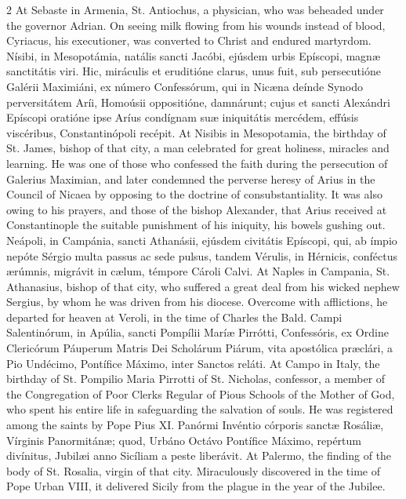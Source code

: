 \begin{paracol}{2}
At Sebaste in Armenia, St. 
 Antiochus, a physician, who was beheaded under the governor Adrian. On 
 seeing milk flowing from his wounds instead of blood, Cyriacus, his 
 executioner, was converted to Christ and endured martyrdom.
\switchcolumn*
{}
Nísibi, in Mesopotámia, natális sancti Jacóbi, ejúsdem urbis Epíscopi, magnæ sanctitátis viri. 
 Hic, miráculis et eruditióne clarus, unus fuit, sub persecutióne Galérii 
 Maximiáni, ex número Confessórum, qui in Nicæna deínde Synodo perversitátem 
 Aríi, Homoúsii oppositióne, damnárunt; cujus et sancti Alexándri Epíscopi 
 oratióne ipse Aríus condígnam suæ iniquitátis mercédem, effúsis viscéribus, 
 Constantinópoli recépit.
\switchcolumn
{}
At Nisibis in Mesopotamia, the 
 birthday of St. James, bishop of that city, a man celebrated for great 
 holiness, miracles and learning. He was one of those who confessed the 
 faith during the persecution of Galerius Maximian, and later condemned the 
 perverse heresy of Arius in the Council of Nicaea by opposing to the 
 doctrine of consubstantiality. It was also owing to his prayers, and 
 those of the bishop Alexander, that Arius received at Constantinople the 
 suitable punishment of his iniquity, his bowels gushing out.
\switchcolumn*
{}
Neápoli, in Campánia, 
 sancti Athanásii, ejúsdem civitátis Epíscopi, qui, ab ímpio nepóte Sérgio 
 multa passus ac sede pulsus, tandem Vérulis, in Hérnicis, conféctus ærúmnis, 
 migrávit in cælum, témpore Cároli Calvi.
\switchcolumn
{}
At Naples in Campania, St. 
 Athanasius, bishop of that city, who suffered a great deal from his wicked 
 nephew Sergius, by whom he was driven from his diocese. Overcome with 
 afflictions, he departed for heaven at Veroli, in the time of Charles the 
 Bald.
\switchcolumn*
{}
Campi Salentinórum, in 
 Apúlia, sancti Pompílii Maríæ Pirrótti, Confessóris, ex Ordine Clericórum 
 Páuperum Matris Dei Scholárum Piárum, vita apostólica præclári, a Pio 
 Undécimo, Pontífice Máximo, inter Sanctos reláti.
\switchcolumn
{}
At Campo in Italy, the birthday of 
 St. Pompilio Maria Pirrotti of St. Nicholas, confessor, a member of the 
 Congregation of Poor Clerks Regular of Pious Schools of the Mother of God, 
 who spent his entire life in safeguarding the salvation of souls. He 
 was registered among the saints by Pope Pius XI.
\switchcolumn*
{}
Panórmi Invéntio 
 córporis sanctæ Rosáliæ, Vírginis Panormitánæ; quod, Urbáno Octávo Pontífice 
 Máximo, repértum divínitus, Jubilæi anno Sicíliam a peste liberávit.
\switchcolumn
{}
At Palermo, the finding of the body 
 of St. Rosalia, virgin of that city. Miraculously discovered in the 
 time of Pope Urban VIII, it delivered Sicily from the plague in the year of 
 the Jubilee.
\switchcolumn*
{}
\end{paracol}


